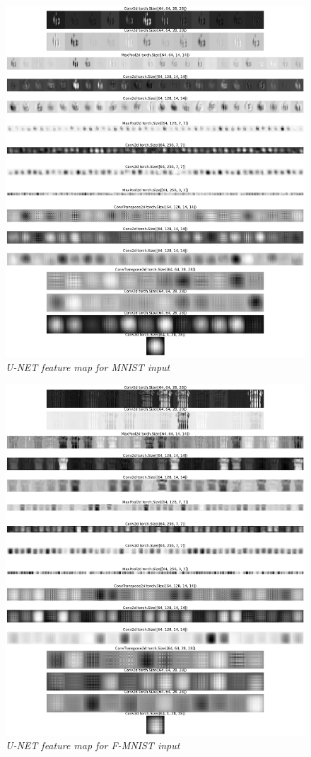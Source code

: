 \begin{figure}[H]
    \centering
    \includegraphics[width=\textwidth]{Figure/Front_page/mnist feature map.png}
    \caption{\textit{U-NET feature map for MNIST input}}
    \label{fig:mnist feature loss}
\end{figure}

\begin{figure}[H]
    \centering
    \includegraphics[width=\textwidth]{Figure/Front_page/fmnist feature map.png}
    \caption{\textit{U-NET feature map for F-MNIST input}}
    \label{fig:fmnist feature map}
\end{figure}